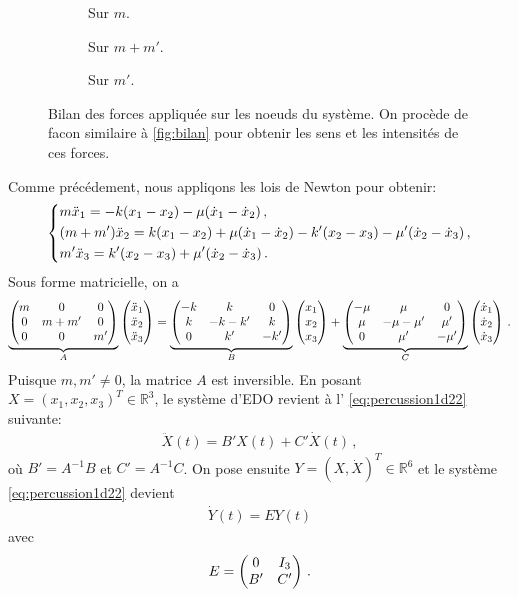 \begin{figure}[!h]
    \begin{subfigure}[b]{0.25\textwidth}
        \centering
        \caption{Sur $m$.}
        \label{fig:bilan12}
    \end{subfigure}
    \begin{subfigure}[b]{0.31\textwidth}
        \centering
        \caption{Sur $m+m'$.}
        \label{fig:bilan22}
    \end{subfigure}
    \begin{subfigure}[b]{0.23\textwidth}
        \centering
        \caption{Sur $m'$.}
        \label{fig:bilan32}
    \end{subfigure}
       \caption{Bilan des forces appliquée sur les noeuds du système. On procède de facon similaire à \cref{fig:bilan} pour obtenir les sens et les intensités de ces forces.}
       \label{fig:bilan2}
\end{figure}

\noindent Comme précédement, nous appliqons les lois de Newton pour obtenir:
\begin{align}
    \begin{dcases}
    m\ddot x_1 = -k(x_1 - x_2) - \mu (\dot x_1 - \dot x_2) \,, \\
    (m+m')\ddot x_2 = k(x_1 - x_2) + \mu (\dot x_1 - \dot x_2) - k'(x_2 - x_3) - \mu'(\dot x_2 - \dot x_3) \,, \\
        m' \ddot x_3 =  k'(x_2 - x_3) + \mu'(\dot x_2 - \dot x_3) \,. 
    \end{dcases}
\end{align}
Sous forme matricielle, on a
\begin{align}
    \underbrace{\begin{pmatrix} m & 0 & 0 \\ 0 & m+m' & 0 \\ 0 & 0 & m' \end{pmatrix}}_{A} \begin{pmatrix} \ddot{x}_1 \\ \ddot{x}_2 \\ \ddot{x}_3 \end{pmatrix} =  
    \underbrace{\begin{pmatrix} -k & k & 0 \\ k & -k-k' & k \\ 0 & k' & -k' \end{pmatrix}}_{B} \begin{pmatrix} x_1 \\ x_2 \\ x_3 \end{pmatrix} + 
    \underbrace{\begin{pmatrix} -\mu & \mu & 0 \\ \mu & -\mu-\mu' & \mu' \\ 0 & \mu' & -\mu' \end{pmatrix}}_{C} \begin{pmatrix} \dot{x}_1 \\ \dot{x}_2 \\ \dot{x}_3 \end{pmatrix} \,.
\end{align}
Puisque $m, m'\neq 0$, la matrice $A$ est inversible. En posant $X = (x_1, x_2, x_3)^T \in \mathbb{R}^3$, le système d'EDO revient à l' \cref{eq:percussion1d22} suivante:
\begin{align} \label{eq:percussion1d22}
        \ddot{X}(t) = B' X(t) + C'\dot{X}(t) \,, 
\end{align}
où $B' = A^{-1}B$ et $C' = A^{-1}C$. On pose ensuite $Y= (X, \dot X)^T \in \mathbb{R}^6$ et le système \cref{eq:percussion1d22} devient 
\begin{align} \label{eq:systeme1d2}
        \dot{Y}(t)= E Y(t)
\end{align}
avec $$ E = \begin{pmatrix} 0 & I_3 \\ B' & C' \end{pmatrix} \,.$$


